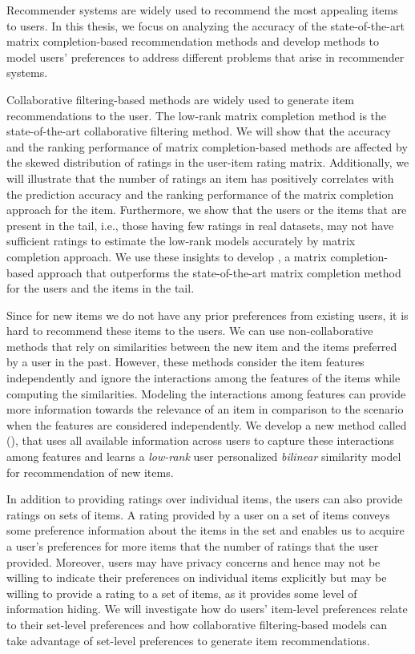 Recommender systems are widely used to recommend the most appealing items to
users.
In this thesis, we focus on analyzing the accuracy of the state-of-the-art matrix
completion-based recommendation methods and develop methods to model users' 
preferences to address different problems that arise in recommender systems.
 
Collaborative filtering-based methods are widely used to generate item recommendations to the user. The low-rank matrix completion method is the state-of-the-art collaborative filtering method.  
We will show that the accuracy and the ranking performance of matrix completion-based
methods are affected by the skewed distribution of ratings in the user-item rating matrix.
Additionally, we will illustrate that the number of ratings an item has positively
correlates with the prediction accuracy and the ranking performance of the matrix
completion approach for the item.
Furthermore, we show that the users or the items that are present in the tail, i.e.,
those having few ratings in real datasets, may not have sufficient ratings to
estimate the low-rank models accurately by matrix completion approach. We use
these insights to develop \TMF, a matrix completion-based approach that outperforms
the state-of-the-art matrix completion method for the users and the items in the tail.


Since for new items we do not have any prior preferences from existing users, it is hard
to recommend these items to the users.  We can use non-collaborative methods that rely
on similarities between the new item and the items preferred by a user in the past.
However, these methods consider the item features independently and ignore the
interactions among the features of the items while computing the similarities. 
Modeling the interactions among features can provide more information towards the
relevance of an item in comparison to the scenario when the features are considered
independently.
We develop a new method called \CFEXPB (\CF), that uses all available information
across users to capture these interactions among features and learns a \emph{low-rank}
user personalized \emph{bilinear} similarity model for \TOPN recommendation
of new items.


In addition to providing ratings over individual items, the users can also provide
ratings on sets of items. A rating provided by a user on a set of items conveys some
preference information about the items in the set and enables us to acquire a user's
preferences for more items that the number of ratings that the user provided. Moreover,
users may have privacy concerns and hence may not be willing to indicate their preferences
on individual items explicitly but may be willing to provide a rating to a set of items,
as it provides some level of information hiding.
We will investigate how do users' item-level preferences relate to their set-level preferences
and how collaborative filtering-based models can take advantage of set-level preferences
to generate item recommendations. 





